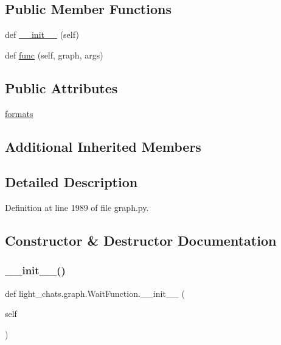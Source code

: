 \subsection*{Public Member Functions}
\begin{DoxyCompactItemize}
\item 
def \hyperlink{classlight__chats_1_1graph_1_1WaitFunction_a08ecc57f17be491ed6a1ee81f38d8d65}{\+\_\+\+\_\+init\+\_\+\+\_\+} (self)
\item 
def \hyperlink{classlight__chats_1_1graph_1_1WaitFunction_a3349dc4d65c4b33440624bdbbeeb420c}{func} (self, graph, args)
\end{DoxyCompactItemize}
\subsection*{Public Attributes}
\begin{DoxyCompactItemize}
\item 
\hyperlink{classlight__chats_1_1graph_1_1WaitFunction_a02e41ee37f4a2fe83153606100a5f979}{formats}
\end{DoxyCompactItemize}
\subsection*{Additional Inherited Members}


\subsection{Detailed Description}


Definition at line 1989 of file graph.\+py.



\subsection{Constructor \& Destructor Documentation}
\mbox{\label{classlight__chats_1_1graph_1_1WaitFunction_a08ecc57f17be491ed6a1ee81f38d8d65}} 
\subsubsection{\texorpdfstring{\+\_\+\+\_\+init\+\_\+\+\_\+()}{\_\_init\_\_()}}
{\footnotesize\ttfamily def light\+\_\+chats.\+graph.\+Wait\+Function.\+\_\+\+\_\+init\+\_\+\+\_\+ (\begin{DoxyParamCaption}\item[{}]{self }\end{DoxyParamCaption})}



